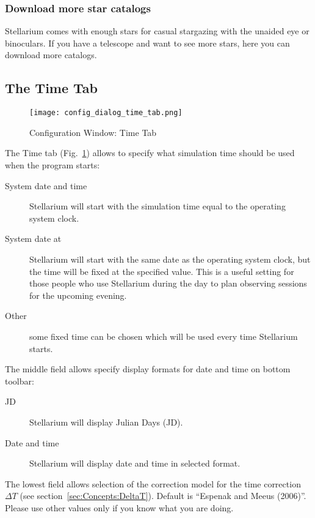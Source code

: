 \subsubsection{Download more star catalogs}
Stellarium comes with enough stars for casual stargazing with the
unaided eye or binoculars. If you have a telescope and want to see
more stars, here you can download more catalogs.

\subsection{The Time Tab}
\label{sec:gui:configuration:time}

\begin{figure}[htbp]
\centering\texttt{[image: config\_dialog\_time\_tab.png]}
\caption{Configuration Window: Time Tab}
\label{fig:gui:configuration:time}
\end{figure}

The Time tab (Fig.~\ref{fig:gui:configuration:time}) allows to specify what simulation time should be used
when the program starts:

\begin{description}
\item[System date and time] Stellarium will start with
  the simulation time equal to the operating system clock.
\item[System date at] Stellarium will start with the
  same date as the operating system clock, but the time will be fixed at
  the specified value. This is a useful setting for those people who use
  Stellarium during the day to plan observing sessions for the upcoming
  evening.
\item[Other] some fixed time can be chosen which will
  be used every time Stellarium starts.
\end{description}

\noindent The middle field allows specify display formats for date and time on bottom toolbar:
\begin{description}
\item[JD] Stellarium will display Julian Days (JD).
\item[Date and time] Stellarium will display date and time in selected format.
\end{description}

\noindent The lowest field allows selection of the correction model for the time
correction $\Delta T$ (see section~\ref{sec:Concepts:DeltaT}). Default
is ``Espenak and Meeus (2006)''. Please use other values only if you
know what you are doing.

